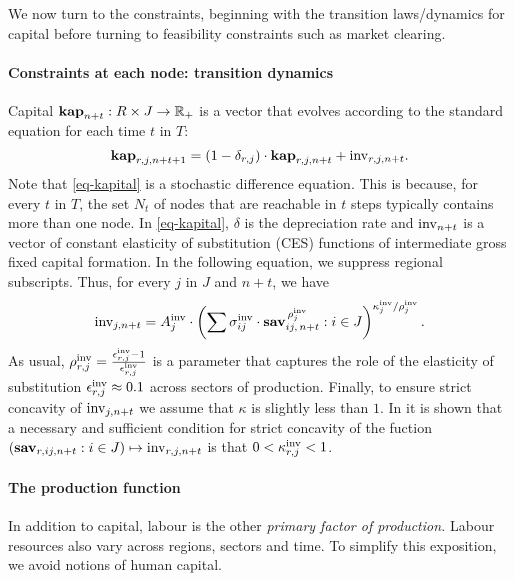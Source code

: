 \documentclass[12pt,a4paper,twoside, draft]{article}
\begin{document}
We now turn to the constraints, beginning with the transition laws/dynamics for
capital before turning to feasibility constraints such as market clearing.
\paragraph{Constraints at each node: transition dynamics}
Capital $\mathbf{kap}_{n + t}: R \times J \rightarrow \mathbb R_+$ is a vector that
evolves according to the standard equation for each time $t$ in $T$:
\begin{equation}\label{eq-kapital}
   \mathbf{kap}_{r, j, n + t + 1} =
     (1 - \delta_{r, j}) \cdot \mathbf{kap}_{r, j, n + t}
       + \textup{inv}_{r, j, n + t}.
\end{equation}
Note that \eqref{eq-kapital} is a stochastic difference equation.
This is because, for every $t$ in $T$, the set $N_t$ of nodes that are
reachable in $t$ steps typically contains more than one node.
In \eqref{eq-kapital}, $\delta$ is the depreciation rate and
$\textup{inv}_{n + t}$ is a vector of constant elasticity of substitution (CES)
functions of intermediate gross fixed capital formation.
In the following equation, we suppress regional subscripts. Thus, for every
$j$ in $J$ and $n + t$, we have
\begin{equation}\label{eq-ces-inv}
	\textup{inv}_{j, n + t} = A_{j}^{\textup{inv}}
    \cdot \left(\sum
      \sigma_{i j} ^ {\textup{inv}} \cdot \mathbf{sav}_{i j,\, n + t}
        ^ {\,\rho_{j} ^ {\textup{inv}}} : i \in J
    \right) ^ {\kappa_{j} ^ \textup{inv} / \rho_{j} ^ \textup{inv}}.
\end{equation}
As usual, $\rho_{r, j} ^ \textup{inv}
  = \frac{\epsilon_{r, j} ^ \textup{inv} - 1}{\epsilon_{r, j} ^ \textup{inv}}$
is a parameter that captures the role of the elasticity of substitution
$\epsilon_{r, j} ^ \textup{inv} \approx 0.1$ across sectors of production.
Finally, to ensure strict concavity of $\textup{inv}_{j, n + t}$ we assume that
$\kappa$ is slightly less than $1$.
In \citet[Theorem 2]{Kojic-Concavity} it is shown that a necessary and
sufficient condition for strict concavity of the fuction
$\left(\mathbf{sav}_{r, ij, n + t}: i \in J\right)
\mapsto \textup{inv}_{r, j, n + t}$ is that $0< \kappa_{r, j}^\textup{inv} < 1$.

\paragraph{The production function}
In addition to capital, labour is the other \emph{primary factor of
production.}
Labour resources also vary across regions, sectors and time.
To simplify this exposition, we avoid notions of human capital.
\end{document}
